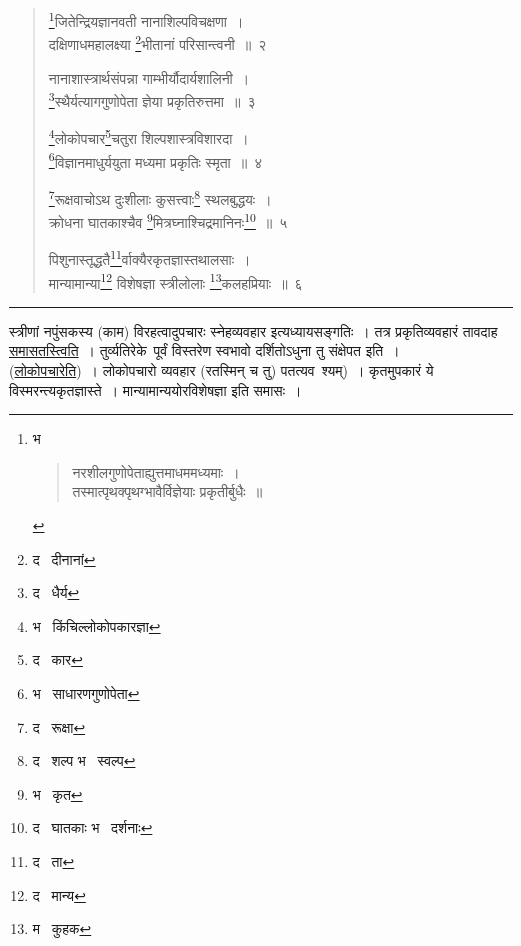 \documentclass[11pt, openany]{book}
\begin{document}
\newpage
{}

\begin{quote}
{\na \renewcommand{\thefootnote}{1}\footnote{भ \textendash\  \begin{quote}
{\qt नरशीलगुणोपेताह्युत्तमाधममध्यमाः~। \\
तस्मात्पृथक्पृथग्भावैर्विज्ञेयाः प्रकृतीर्बुधैः~॥}
\end{quote}}जितेन्द्रियज्ञानवती नानाशिल्पविचक्षणा~।\\
दक्षिणाधमहालक्ष्या \renewcommand{\thefootnote}{2}\footnote{द \textendash\  दीनानां}भीतानां परिसान्त्वनी~॥~२

नानाशास्त्रार्थसंपन्ना गाम्भीर्यौदार्यशालिनी~।\\
\renewcommand{\thefootnote}{3}\footnote{द \textendash\  धैर्य}स्थैर्यत्यागगुणोपेता ज्ञेया प्रकृतिरुत्तमा~॥~३

\renewcommand{\thefootnote}{4}\footnote{भ \textendash\  किंचिल्लोकोपकारज्ञा}लोकोपचार\renewcommand{\thefootnote}{5}\footnote{द \textendash\  कार}चतुरा शिल्पशास्त्रविशारदा~।\\
\renewcommand{\thefootnote}{6}\footnote{भ \textendash\  साधारणगुणोपेता}विज्ञानमाधुर्ययुता मध्यमा प्रकृतिः स्मृता~॥~४

\renewcommand{\thefootnote}{7}\footnote{द \textendash\  रूक्षा}रूक्षवाचोऽथ दुःशीलाः कुसत्त्वाः\renewcommand{\thefootnote}{8}\footnote{द \textendash\  शल्प भ \textendash\  स्वल्प} स्थलबुद्धयः~।\\
क्रोधना घातकाश्चैव \renewcommand{\thefootnote}{9}\footnote{भ \textendash\  कृत}मित्रघ्नाश्चिद्रमानिनः\renewcommand{\thefootnote}{10}\footnote{द \textendash\  घातकाः भ \textendash\  दर्शनाः}~॥~५

पिशुनास्तूद्धतै\renewcommand{\thefootnote}{11}\footnote{द \textendash\  ता}र्वाक्यैरकृतज्ञास्तथालसाः~।\\
मान्यामान्या\renewcommand{\thefootnote}{12}\footnote{द \textendash\  मान्य} विशेषज्ञा स्त्रीलोलाः \renewcommand{\thefootnote}{13}\footnote{म \textendash\  कुहक}कलहप्रियाः~॥~६}
\end{quote}

\hrule

\vspace{2mm}
\noindent
स्त्रीणां नपुंसकस्य (काम) विरहत्वादुपचारः स्नेहव्यवहार इत्यध्यायसङ्गतिः~। तत्र प्रकृतिव्यवहारं तावदाह \underline{समासतस्त्विति}~। तुर्व्यतिरेके\textendash\ पूर्वं विस्तरेण स्वभावो दर्शितोऽधुना तु संक्षेपत इति~।\\

(\underline{लोकोपचारेति})~। लोकोपचारो व्यवहार (रतस्मिन् च तु) पतत्यव\textendash\ श्यम्)~। कृतमुपकारं ये विस्मरन्त्यकृतज्ञास्ते~। मान्यामान्ययोरविशेषज्ञा इति समासः~।
\end{document}
